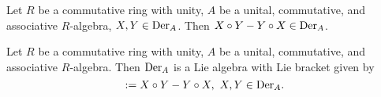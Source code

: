 \begin{proposition}
  Let $R$ be a commutative ring with unity,
  $A$ be a unital, commutative, and associative $R$-algebra,
  $X, Y \in {\rm Der}_A$.
  Then $X \circ Y - Y \circ X \in {\rm Der}_A$.
\end{proposition}
\begin{corollary}
  Let $R$ be a commutative ring with unity,
  $A$ be a unital, commutative, and associative $R$-algebra.
  Then ${\rm Der}_A$ is a Lie algebra with Lie bracket given by
  \begin{equation}
    [X, Y] := X \circ Y - Y \circ X,\ X, Y \in {\rm Der}_A. 
  \end{equation}
\end{corollary}
